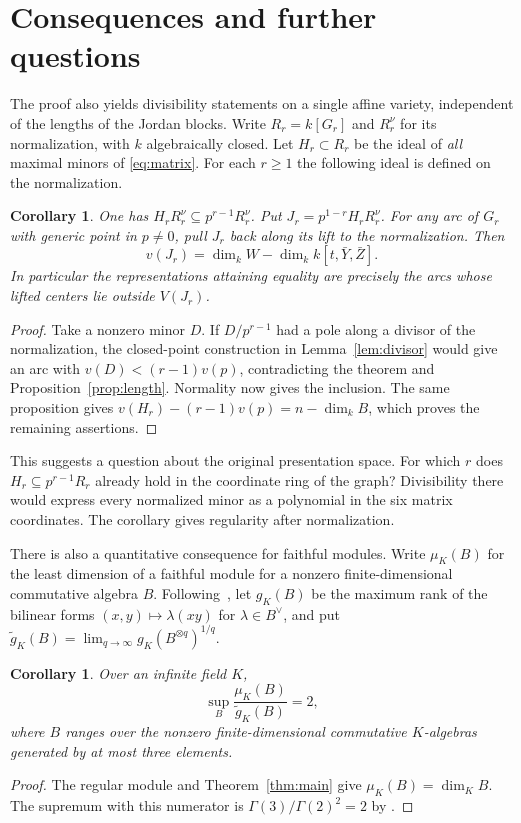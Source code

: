 \documentclass[11pt,reqno]{amsart}
\newtheorem{corollary}[theorem]{Corollary}
\theoremstyle{definition}
\begin{document}
\section{Consequences and further questions}\label{sec:consequences}
The proof also yields divisibility statements on a single affine variety,
independent of the lengths of the Jordan blocks. Write \(R_r=k[G_r]\)
and \(R_r^\nu\) for its normalization, with \(k\) algebraically closed.
Let \(H_r\subset R_r\) be the ideal of \emph{all} maximal minors of
\eqref{eq:matrix}. For each \(r\geq1\) the following ideal is defined on
the normalization.
\begin{corollary}\label{cor:ideal}
One has \(H_r R_r^\nu\subseteq p^{r-1}R_r^\nu\).
Put \(J_r=p^{1-r}H_r R_r^\nu\). For any arc of \(G_r\) with generic point
in \(p\ne0\), pull \(J_r\) back along its lift to the normalization.
Then
\[
            v(J_r)=\dim_k W-\dim_k k[t,\bar Y,\bar Z].
\]
In particular the representations attaining equality are precisely the
arcs whose lifted centers lie outside \(V(J_r)\).
\end{corollary}
\begin{proof}
Take a nonzero minor \(D\). If \(D/p^{r-1}\) had a pole along a divisor
of the normalization, the closed-point construction in
Lemma~\ref{lem:divisor} would give an arc with \(v(D)<(r-1)v(p)\),
contradicting the theorem and Proposition~\ref{prop:length}. Normality
now gives the inclusion. The same proposition gives
\(v(H_r)-(r-1)v(p)=n-\dim_k B\), which proves the remaining assertions.
\end{proof}
This suggests a question about the original presentation space. For
which \(r\) does \(H_r\subseteq p^{r-1}R_r\) already hold in the
coordinate ring of the graph? Divisibility there would express every
normalized minor as a polynomial in the six matrix coordinates. The
corollary gives regularity after normalization.

There is also a quantitative consequence for faithful modules. Write
\(\mu_K(B)\) for the least dimension of a faithful module for a nonzero
finite-dimensional commutative algebra \(B\). Following~\cite{LSZ}, let
\(g_K(B)\) be the maximum rank of the bilinear forms
\((x,y)\mapsto\lambda(xy)\) for \(\lambda\in B^\vee\), and put
\(\widetilde g_K(B)=\lim_{q\to\infty}g_K(B^{\otimes q})^{1/q}\).
\begin{corollary}\label{cor:rank}
Over an infinite field \(K\),
\[
     \sup_{B}\frac{\mu_K(B)}{\widetilde g_K(B)}=2 ,
\]
where \(B\) ranges over the nonzero finite-dimensional commutative
\(K\)-algebras generated by at most three elements.
\end{corollary}
\begin{proof}
The regular module and Theorem~\ref{thm:main} give
\(\mu_K(B)=\dim_K B\). The supremum with this numerator is
\(\Gamma(3)/\Gamma(2)^2=2\) by \cite[Theorem~1.3]{LSZ}.
\end{proof}
\end{document}
